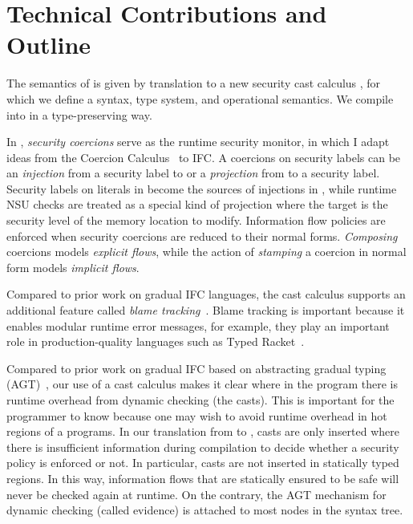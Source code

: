 \section{Technical Contributions and Outline}

The semantics of \Surface is given by translation to a new security cast
calculus \CC, for which we define a syntax, type system, and operational
semantics. We compile \Surface into \CC in a type-preserving way.

In \CC, \textit{security coercions} serve as the runtime security monitor, in
which I adapt ideas from the Coercion
Calculus~\parencite{Henglein:1994nz,Herman:2010aa} to IFC. A coercions on
security labels can be an \textit{injection} from a security label to \unk or a
\textit{projection} from \unk to a security label. Security labels on literals
in \Surface become the sources of injections in \CC, while runtime NSU checks
are treated as a special kind of projection where the target is the security
level of the memory location to modify. Information flow policies are enforced
when security coercions are reduced to their normal forms. \textit{Composing}
coercions models \textit{explicit flows}, while the action of \textit{stamping}
a coercion in normal form models \textit{implicit flows}.

Compared to prior work on gradual IFC languages, the \CC cast calculus supports
an additional feature called \textit{blame tracking}~\parencite{Findler:2002eu}.
Blame tracking is important because it enables modular runtime error messages,
for example, they play an important role in production-quality languages such as
Typed Racket~\parencite{Tobin-Hochstadt:2008lr,Preston-Tunnell-Wilson:2018aa}.

Compared to prior work on gradual IFC based on abstracting gradual typing
(AGT)~\parencite{Toro:2018aa}, our use of a cast calculus makes it clear where
in the program there is runtime overhead from dynamic checking (the casts). This
is important for the programmer to know because one may wish to avoid runtime
overhead in hot regions of a programs. In our translation from \Surface to \CC,
casts are only inserted where there is insufficient information during
compilation to decide whether a security policy is enforced or not. In
particular, casts are not inserted in statically typed regions. In this way,
information flows that are statically ensured to be safe will never be checked
again at runtime. On the contrary, the AGT mechanism for dynamic checking
(called evidence) is attached to most nodes in the syntax tree.

